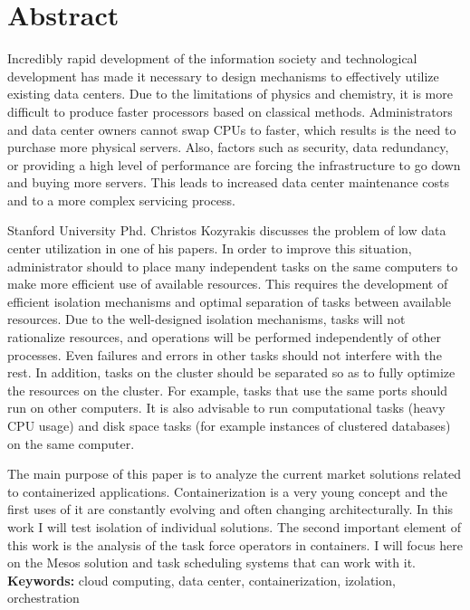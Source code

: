 \documentclass[10pt,a4paper,titlepage,twoside]{report}
\begin{document}
\newpage
\section*{Abstract}

\indent\indent Incredibly rapid development of the information society and technological development has made it necessary to design mechanisms to effectively utilize existing data centers. Due to the limitations of physics and chemistry, it is more difficult to produce faster processors based on classical methods. Administrators and data center owners cannot swap CPUs to faster, which results is the need to purchase more physical servers. Also, factors such as security, data redundancy, or providing a high level of performance are forcing the infrastructure to go down and buying more servers. This leads to increased data center maintenance costs and to a more complex servicing process.

Stanford University Phd. Christos Kozyrakis discusses the problem of low data center utilization in one of his papers. In order to improve this situation, administrator should to place many independent tasks on the same computers to make more efficient use of available resources. This requires the development of efficient isolation mechanisms and optimal separation of tasks between available resources. Due to the well-designed isolation mechanisms, tasks will not rationalize resources, and operations will be performed independently of other processes. Even failures and errors in other tasks should not interfere with the rest. In addition, tasks on the cluster should be separated so as to fully optimize the resources on the cluster. For example, tasks that use the same ports should run on other computers. It is also advisable to run computational tasks (heavy CPU usage) and disk space tasks (for example instances of clustered databases) on the same computer.

The main purpose of this paper is to analyze the current market solutions related to containerized applications. Containerization is a very young concept and the first uses of it are constantly evolving and often changing architecturally. In this work I will test isolation of individual solutions. The second important element of this work is the analysis of the task force operators in containers. I will focus here on the Mesos solution and task scheduling systems that can work with it.
\newline
\newline
\newline
\textbf{Keywords:} cloud computing, data center, containerization, izolation, orchestration
\end{document}
